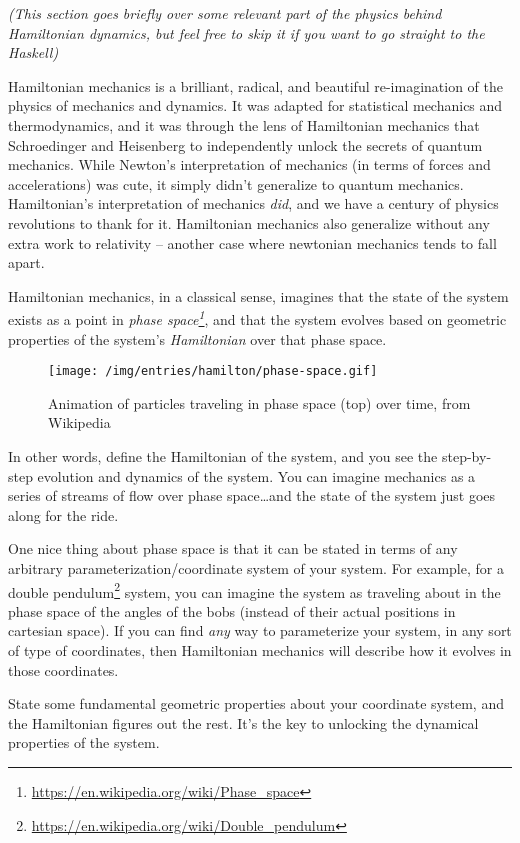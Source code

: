 \documentclass[]{article}
\renewcommand{\href}[2]{#2\footnote{\url{#1}}}
\begin{document}
\emph{(This section goes briefly over some relevant part of the physics behind
Hamiltonian dynamics, but feel free to skip it if you want to go straight to the
Haskell)}

Hamiltonian mechanics is a brilliant, radical, and beautiful re-imagination of
the physics of mechanics and dynamics. It was adapted for statistical mechanics
and thermodynamics, and it was through the lens of Hamiltonian mechanics that
Schroedinger and Heisenberg to independently unlock the secrets of quantum
mechanics. While Newton's interpretation of mechanics (in terms of forces and
accelerations) was cute, it simply didn't generalize to quantum mechanics.
Hamiltonian's interpretation of mechanics \emph{did}, and we have a century of
physics revolutions to thank for it. Hamiltonian mechanics also generalize
without any extra work to relativity -- another case where newtonian mechanics
tends to fall apart.

Hamiltonian mechanics, in a classical sense, imagines that the state of the
system exists as a point in
\emph{\href{https://en.wikipedia.org/wiki/Phase_space}{phase space}}, and that
the system evolves based on geometric properties of the system's
\emph{Hamiltonian} over that phase space.

\begin{figure}[htbp]
\centering
\texttt{[image: /img/entries/hamilton/phase-space.gif]}
\caption{Animation of particles traveling in phase space (top) over time, from
Wikipedia}
\end{figure}

In other words, define the Hamiltonian of the system, and you see the
step-by-step evolution and dynamics of the system. You can imagine mechanics as
a series of streams of flow over phase space\ldots{}and the state of the system
just goes along for the ride.

One nice thing about phase space is that it can be stated in terms of any
arbitrary parameterization/coordinate system of your system. For example, for a
\href{https://en.wikipedia.org/wiki/Double_pendulum}{double pendulum} system,
you can imagine the system as traveling about in the phase space of the angles
of the bobs (instead of their actual positions in cartesian space). If you can
find \emph{any} way to parameterize your system, in any sort of type of
coordinates, then Hamiltonian mechanics will describe how it evolves in those
coordinates.

State some fundamental geometric properties about your coordinate system, and
the Hamiltonian figures out the rest. It's the key to unlocking the dynamical
properties of the system.
\end{document}

